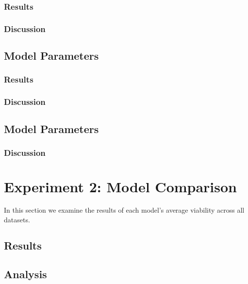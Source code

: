 \documentclass[12pt,a4paper]{report}
\begin{document}
\subsubsection{Results}

\subsubsection{Discussion}

\subsection{Model Parameters}
\subsubsection{Results}

\subsubsection{Discussion}

\subsection{Model Parameters}
\subsubsection{Discussion}




\section{Experiment 2: Model Comparison}
\label{sec:overall}
In this section we examine the results of each model's average viability across all datasets. 
\subsection{Results}

\subsection{Analysis}

\end{document}
